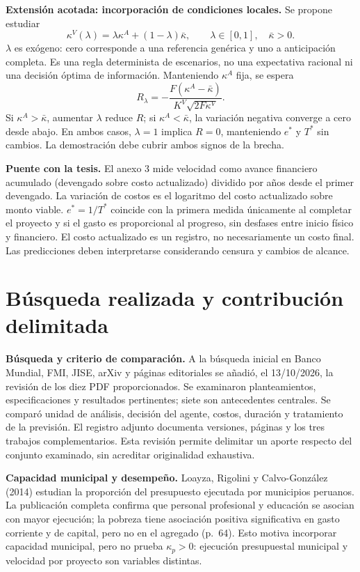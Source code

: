 \documentclass[11pt,a4paper]{article}
\begin{document}
\textbf{Extensión acotada: incorporación de condiciones locales.} Se propone estudiar
\begin{equation}
\kappa^V(\lambda)=\lambda\kappa^A+(1-\lambda)\bar\kappa,
\qquad \lambda\in[0,1],\quad\bar\kappa>0.
\label{eq:lambda}
\end{equation}
$\lambda$ es exógeno: cero corresponde a una referencia genérica y uno a anticipación completa. Es una regla determinista de escenarios, no una expectativa racional ni una decisión óptima de información. Manteniendo $\kappa^A$ fija, se espera
\begin{equation}
R_\lambda=-\frac{F(\kappa^A-\bar\kappa)}{K^V\sqrt{2F\kappa^V}}.
\end{equation}
Si $\kappa^A>\bar\kappa$, aumentar $\lambda$ reduce $R$; si $\kappa^A<\bar\kappa$, la variación negativa converge a cero desde abajo. En ambos casos, $\lambda=1$ implica $R=0$, manteniendo $e^*$ y $T^*$ sin cambios. La demostración debe cubrir ambos signos de la brecha.

\textbf{Puente con la tesis.} El anexo 3 mide velocidad como avance financiero acumulado (devengado sobre costo actualizado) dividido por años desde el primer devengado. La variación de costos es el logaritmo del costo actualizado sobre monto viable. $e^*=1/T^*$ coincide con la primera medida únicamente al completar el proyecto y si el gasto es proporcional al progreso, sin desfases entre inicio físico y financiero. El costo actualizado es un registro, no necesariamente un costo final. Las predicciones deben interpretarse considerando censura y cambios de alcance.
\newpage
\section{Búsqueda realizada y contribución delimitada}
\textbf{Búsqueda y criterio de comparación.} A la búsqueda inicial en Banco Mundial, FMI, JISE, arXiv y páginas editoriales se añadió, el 13/10/2026, la revisión de los diez PDF proporcionados. Se examinaron planteamientos, especificaciones y resultados pertinentes; siete son antecedentes centrales. Se comparó unidad de análisis, decisión del agente, costos, duración y tratamiento de la previsión. El registro adjunto documenta versiones, páginas y los tres trabajos complementarios. Esta revisión permite delimitar un aporte respecto del conjunto examinado, sin acreditar originalidad exhaustiva.

\textbf{Capacidad municipal y desempeño.} Loayza, Rigolini y Calvo-González (2014) estudian la proporción del presupuesto ejecutada por municipios peruanos. La publicación completa confirma que personal profesional y educación se asocian con mayor ejecución; la pobreza tiene asociación positiva significativa en gasto corriente y de capital, pero no en el agregado (p.\ 64). Esto motiva incorporar capacidad municipal, pero no prueba $\kappa_p>0$: ejecución presupuestal municipal y velocidad por proyecto son variables distintas.
\end{document}
